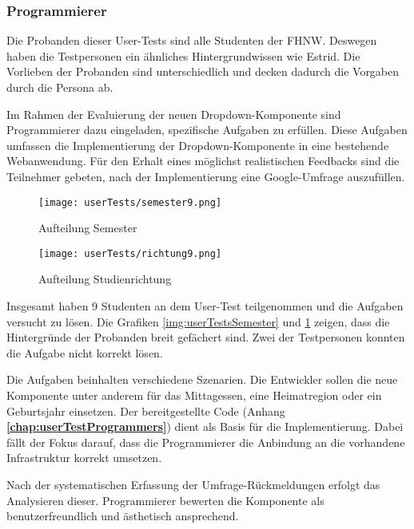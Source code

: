 \subsubsection{\color{dblue} Programmierer}
\label{sec:userTestsProgrammer}

Die Probanden dieser User-Tests sind alle Studenten der FHNW. 
Deswegen haben die Testpersonen ein ähnliches Hintergrundwissen wie Estrid. 
Die Vorlieben der Probanden sind unterschiedlich und decken dadurch die Vorgaben durch die Persona ab. 

Im Rahmen der Evaluierung der neuen Dropdown-Komponente sind Programmierer dazu eingeladen, spezifische Aufgaben zu erfüllen. 
Diese Aufgaben umfassen die Implementierung der Dropdown-Komponente in eine bestehende Webanwendung. 
Für den Erhalt eines möglichst realistischen Feedbacks sind die Teilnehmer gebeten, nach der Implementierung eine Google-Umfrage auszufüllen. 

\begin{figure}[!htb]
    \centering
    \begin{minipage}[b]{0.45\textwidth}
        \centering
        \texttt{[image: userTests/semester9.png]}
        \caption{\centering Aufteilung Semester}
        \label{img:userTestsSemester}
    \end{minipage}
    \hfill
    \begin{minipage}[b]{0.45\textwidth}
        \centering
        \texttt{[image: userTests/richtung9.png]}
        \caption{\centering Aufteilung Studienrichtung}
        \label{img:userTestsStudy}
    \end{minipage}
\end{figure}

Insgesamt haben 9 Studenten an dem User-Test teilgenommen und die Aufgaben versucht zu lösen. 
Die Grafiken \ref{img:userTestsSemester} und \ref{img:userTestsStudy} zeigen, dass die Hintergründe der Probanden breit gefächert sind. 
Zwei der Testpersonen konnten die Aufgabe nicht korrekt lösen. 

Die Aufgaben beinhalten verschiedene Szenarien. 
Die Entwickler sollen die neue Komponente unter anderem für das Mittagessen, eine Heimatregion oder ein Geburtsjahr einsetzen. 
Der bereitgestellte Code (Anhang \textbf{\ref{chap:userTestProgrammers}}) dient als Basis für die Implementierung. 
Dabei fällt der Fokus darauf, dass die Programmierer die Anbindung an die vorhandene Infrastruktur korrekt umsetzen. 

Nach der systematischen Erfassung der Umfrage-Rückmeldungen erfolgt das Analysieren dieser. 
Programmierer bewerten die Komponente als benutzerfreundlich und ästhetisch ansprechend. 

